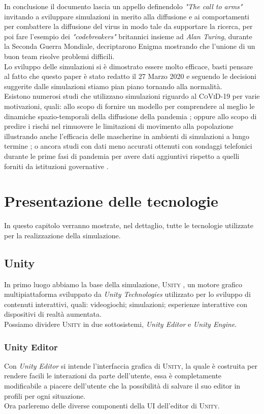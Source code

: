 \documentclass[12pt, openany]{book}
\begin{document}
	In conclusione il documento lascia un appello definendolo \emph{"The call to arms"} invitando a sviluppare simulazioni in merito alla diffusione e ai comportamenti per combattere la diffusione del virus in modo tale da supportare la ricerca, per poi fare l'esempio dei \emph{"codebreakers"} britannici insieme ad \emph{Alan Turing}, durante la Seconda Guerra Mondiale, decriptarono Enigma mostrando che l'unione di un buon team risolve problemi difficili.\\
	Lo sviluppo delle simulazioni si è dimostrato essere molto efficace, basti pensare al fatto che questo paper è stato redatto il 27 Marzo 2020 e seguendo le decisioni suggerite dalle simulazioni stiamo pian piano tornando alla normalità.\\	
	Esistono numerosi studi che utilizzano simulazioni riguardo al \textsc{CoViD-19} per varie motivazioni, quali: allo scopo di fornire un modello per comprendere al meglio le dinamiche spazio-temporali della diffusione della pandemia \cite{Singapore}; oppure allo scopo di predire i rischi nel rimuovere le limitazioni di movimento alla popolazione illustrando anche l'efficacia delle mascherine in ambienti di simulazioni a lungo termine \cite{Madrid}; o ancora studi con dati meno accurati ottenuti con sondaggi telefonici durante le prime fasi di pandemia per avere dati aggiuntivi rispetto a quelli forniti da istituzioni governative \cite{HongKong}.
	\chapter{Presentazione delle tecnologie}
	In questo capitolo verranno mostrate, nel dettaglio, tutte le tecnologie utilizzate per la realizzazione della simulazione.
	\section{Unity}
	In primo luogo abbiamo la base della simulazione, \textsc{Unity} \cite{Unity}, un motore grafico multipiattaforma sviluppato da \emph{Unity Technologies} utilizzato per lo sviluppo di contenuti interattivi, quali: videogiochi; simulazioni; esperienze interattive con dispositivi di realtà aumentata. \\
	Possiamo dividere \textsc{Unity} in due sottosistemi,\emph{ Unity Editor} e \emph{Unity Engine}. 
	\subsection{Unity Editor}
	Con \emph{Unity Editor} si intende l'interfaccia grafica di \textsc{Unity}, la quale è costruita per rendere facili le interazioni da parte dell'utente, essa è completamente modificabile a piacere dell'utente che la possibilità di salvare il suo editor in profili per ogni situazione.\\
	Ora parleremo delle diverse componenti della UI dell'editor di \textsc{Unity}.
\end{document}
